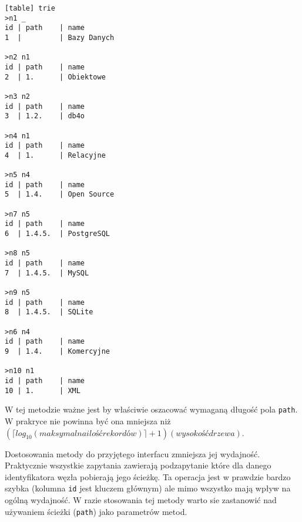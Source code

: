 \begin{verbatim}[table] trie
>n1 _
id | path    | name
1  |         | Bazy Danych

>n2 n1
id | path    | name
2  | 1.      | Obiektowe

>n3 n2
id | path    | name
3  | 1.2.    | db4o

>n4 n1
id | path    | name
4  | 1.      | Relacyjne

>n5 n4
id | path    | name
5  | 1.4.    | Open Source

>n7 n5
id | path    | name
6  | 1.4.5.  | PostgreSQL

>n8 n5
id | path    | name
7  | 1.4.5.  | MySQL

>n9 n5
id | path    | name
8  | 1.4.5.  | SQLite

>n6 n4
id | path    | name
9  | 1.4.    | Komercyjne

>n10 n1
id | path    | name
10 | 1.      | XML

\end{verbatim}



W tej metodzie ważne jest by właściwie oszacować wymaganą długość pola \texttt{path}.
W prakryce nie powinna być ona mniejsza niż $(\lceil log_{10}(maksymalna ilość rekordów) \rceil + 1)(wysokość drzewa)$.














Dostosowania metody do przyjętego interfacu zmniejsza jej wydajność.
Praktycznie wszystkie zapytania zawierają podzapytanie które dla danego identyfikatora węzła  pobierają jego ścieżkę.
Ta operacja jest w prawdzie bardzo szybka (kolumna \texttt{id} jest kluczem głównym) ale mimo wszystko mają wpływ na ogólną wydajność.
W razie stosowania tej metody warto sie zastanowić nad używaniem ścieżki (\texttt{path}) jako parametrów metod. 

